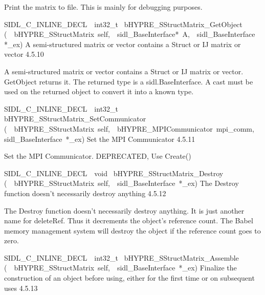 \documentclass{article}
\begin{document}
\begin{cxxentry}
\begin{cxxentry}
\begin{cxxfunction}
\begin{cxxdoc}
Print the matrix to file.  This is mainly for debugging
purposes.
\end{cxxdoc}
\end{cxxfunction}
\begin{cxxfunction}
{SIDL\_C\_INLINE\_DECL\ \ int32\_t\ }
        {bHYPRE\_SStructMatrix\_GetObject}
        {(\ \ bHYPRE\_SStructMatrix\ self,\ \ sidl\_BaseInterface*\ A,\ \ sidl\_BaseInterface\ *\_ex)}
        {
A semi-structured matrix or vector contains a Struct or IJ matrix
or vector}
        {4.5.10}
\begin{cxxdoc}

A semi-structured matrix or vector contains a Struct or IJ matrix
or vector.  GetObject returns it.
The returned type is a sidl.BaseInterface.
A cast must be used on the returned object to convert it into a known type.
\end{cxxdoc}
\end{cxxfunction}
\begin{cxxfunction}
{SIDL\_C\_INLINE\_DECL\ \ int32\_t\ }
        {bHYPRE\_SStructMatrix\_SetCommunicator}
        {(\ \ bHYPRE\_SStructMatrix\ self,\ \ bHYPRE\_MPICommunicator\ mpi\_comm,\ \ sidl\_BaseInterface\ *\_ex)}
        {
Set the MPI Communicator}
        {4.5.11}
\begin{cxxdoc}

Set the MPI Communicator.  DEPRECATED, Use Create()
\end{cxxdoc}
\end{cxxfunction}
\begin{cxxfunction}
{SIDL\_C\_INLINE\_DECL\ \ void\ }
        {bHYPRE\_SStructMatrix\_Destroy}
        {(\ \ bHYPRE\_SStructMatrix\ self,\ \ sidl\_BaseInterface\ *\_ex)}
        {
The Destroy function doesn't necessarily destroy anything}
        {4.5.12}
\begin{cxxdoc}

The Destroy function doesn't necessarily destroy anything.
It is just another name for deleteRef.  Thus it decrements the
object's reference count.  The Babel memory management system will
destroy the object if the reference count goes to zero.
\end{cxxdoc}
\end{cxxfunction}
\begin{cxxfunction}
{SIDL\_C\_INLINE\_DECL\ \ int32\_t\ }
        {bHYPRE\_SStructMatrix\_Assemble}
        {(\ \ bHYPRE\_SStructMatrix\ self,\ \ sidl\_BaseInterface\ *\_ex)}
        {
Finalize the construction of an object before using, either
for the first time or on subsequent uses}
        {4.5.13}
\begin{cxxdoc}


\end{cxxdoc}
\end{cxxfunction}
\end{cxxentry}
\end{cxxentry}
\end{document}
